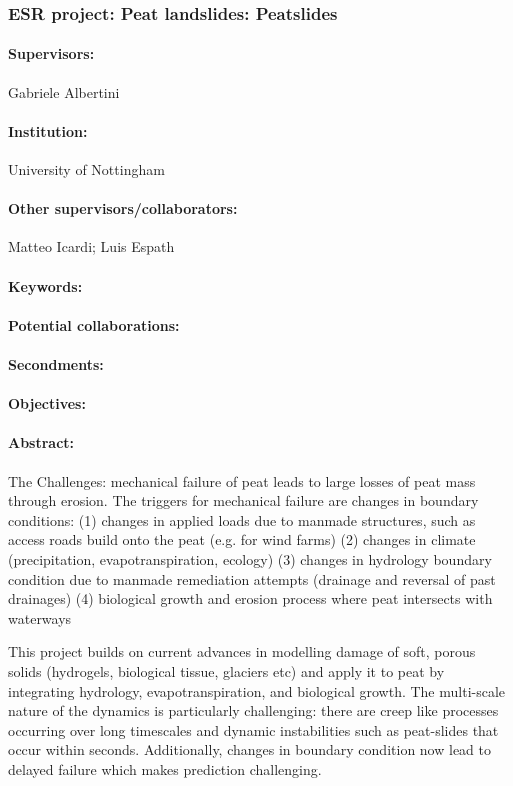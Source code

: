 \documentclass[12pt]{article}
\begin{document}
\subsubsection*{ESR project: Peat landslides: Peatslides}
\paragraph{Supervisors:} Gabriele Albertini
\paragraph{Institution:} University of Nottingham
\paragraph{Other supervisors/collaborators:} Matteo Icardi; Luis Espath
\paragraph{Keywords:} 
\paragraph{Potential collaborations:} 
\paragraph{Secondments:} 
\paragraph{Objectives:} 
\paragraph{Abstract:} The Challenges: mechanical failure of peat leads to large losses of peat mass through erosion. The triggers for mechanical failure are changes in boundary conditions:
(1) changes in applied loads due to manmade structures, such as access roads build onto the peat (e.g. for wind farms)
(2) changes in climate (precipitation, evapotranspiration, ecology)
(3) changes in hydrology boundary condition due to manmade remediation attempts (drainage and reversal of past drainages)
(4) biological growth and erosion process where peat intersects with waterways
 
This project builds on current advances in modelling damage of soft, porous solids (hydrogels, biological tissue, glaciers etc) and apply it to peat by integrating hydrology, evapotranspiration, and biological growth. The multi-scale nature of the dynamics is particularly challenging: there are creep like processes occurring over long timescales and dynamic instabilities such as peat-slides that occur within seconds. Additionally, changes in boundary condition now lead to delayed failure which makes prediction challenging.  
 
\end{document}
